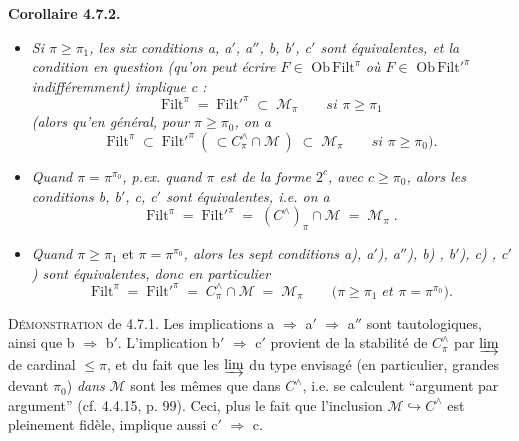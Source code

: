 \documentclass[11pt]{article}
\newcommand{\printedpage}[1]{\marginpar{\footnotesize p.~#1}}
\newcommand{\Mc}{\mathcal{M}}
\begin{document}
\textbf{Corollaire 4.7.2.}
\begin{itemize}[leftmargin=4em]
\item[\textit{1°)}] \textit{Si $\pi \geqslant \pi_1$, les six conditions a, a$'$, a$''$, b, b$'$, c$'$ sont équivalentes, et la condition en question (qu'on peut écrire $F \in$} $\mathrm{Ob}\,\mathrm{Filt}^{\pi}$ \textit{où $F \in$} $\mathrm{Ob}\,\mathrm{Filt}'^{\pi}$ \textit{indifféremment) implique c :} %
\[
\mathrm{Filt}^{\pi} \;=\; \mathrm{Filt}'^{\pi} \;\subset\; \Mc_{\pi} \qquad \textit{si } \pi \geqslant \pi_1 \tag*{(4.7.2.1)}
\]
\textit{(alors qu'en général, pour $\pi \geqslant \pi_0$, on a}
\[
\mathrm{Filt}^{\pi} \;\subset\; \mathrm{Filt}'^{\pi}\ (\,\subset C^{\wedge}_{\pi} \cap \Mc\,) \;\subset\; \Mc_{\pi} \qquad \textit{si } \pi \geqslant \pi_0\textit{).} \tag*{(4.7.2.2)}
\]
\item[\textit{2°)}] \textit{Quand $\pi = \pi^{\pi_0}$, p.ex. quand $\pi$ est de la forme $2^{c}$, avec $c \geqslant \pi_0$, alors les conditions b, b$'$, c, c$'$ sont équivalentes, i.e. on a}
\[
\mathrm{Filt}^{\pi} \;=\; \mathrm{Filt}'^{\pi} \;=\; (C^{\wedge})_{\pi} \cap \Mc \;=\; \Mc_{\pi}\;. \tag*{(4.7.3.2)} %
\]
\item[\textit{3°)}] \textit{Quand $\pi \geqslant \pi_1$} et \textit{$\pi = \pi^{\pi_0}$, alors les sept conditions a), a$'$), a$''$), b) , b$'$), c) , c$'$) sont équivalentes, donc en particulier}
\[
\mathrm{Filt}^{\pi} \;=\; \mathrm{Filt}'^{\pi} \;=\; C^{\wedge}_{\pi} \cap \Mc \;=\; \Mc_{\pi} \qquad (\pi \geqslant \pi_1 \textit{ et } \pi = \pi^{\pi_0}\textit{).} \tag*{(4.7.2.4)}
\]
\end{itemize}

\printedpage{54}

\textsc{Démonstration} de 4.7.1. Les implications a $\Longrightarrow$ a$'$ $\Longrightarrow$ a$''$ sont tautologiques, ainsi que b $\Longrightarrow$ b$'$. L’implication b$'$ $\Longrightarrow$ c$'$ provient de la stabilité de $C^{\wedge}_{\pi}$ par $\varinjlim$ de cardinal $\leqslant \pi$, et du fait que les $\varinjlim$ du type envisagé (en particulier, grandes devant $\pi_0$) \textit{dans} $\mathcal{M}$ sont les mêmes que dans $C^{\wedge}$, i.e. se calculent “argument par argument” (cf. 4.4.15, p. 99). Ceci, plus le fait que l’inclusion $\mathcal{M} \hookrightarrow C^{\wedge}$ est pleinement fidèle, implique aussi c$'$ $\Longrightarrow$ c.
\end{document}
